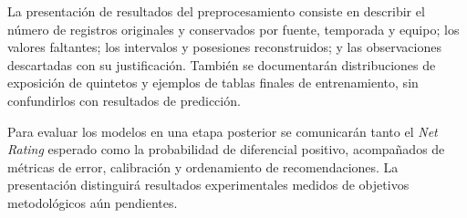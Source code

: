 La presentación de resultados del preprocesamiento consiste en describir el número de registros originales y conservados por fuente, temporada y equipo; los valores faltantes; los intervalos y posesiones reconstruidos; y las observaciones descartadas con su justificación. También se documentarán distribuciones de exposición de quintetos y ejemplos de tablas finales de entrenamiento, sin confundirlos con resultados de predicción.

Para evaluar los modelos en una etapa posterior se comunicarán tanto el \textit{Net Rating} esperado como la probabilidad de diferencial positivo, acompañados de métricas de error, calibración y ordenamiento de recomendaciones. La presentación distinguirá resultados experimentales medidos de objetivos metodológicos aún pendientes.